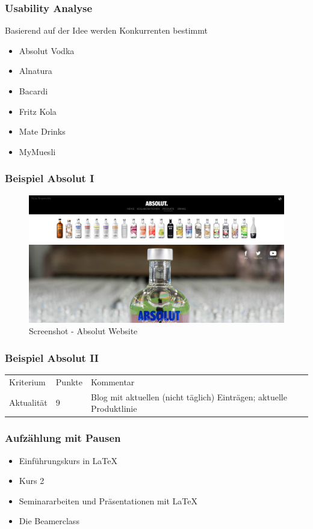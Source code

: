 \begin{frame}\frametitle{Usability Analyse}
Basierend auf der Idee werden Konkurrenten bestimmt
\begin{itemize}
\item Absolut Vodka
\item Alnatura
\item Bacardi
\item Fritz Kola
\item Mate Drinks
\item MyMuesli
\end{itemize}
\end{frame}

\begin{frame}\frametitle{Beispiel Absolut I}
\begin{figure}
\includegraphics[scale=0.2]{absolut}
\caption[Screenshot - Absolut Vodka]{Screenshot - Absolut Website}
\label{labelname}
\end{figure}
\end{frame}

\begin{frame}\frametitle{Beispiel Absolut II}
\begin{tabular}{lll}
  Kriterium & Punkte & Kommentar \\
  Aktualität & 9 & Blog mit aktuellen (nicht täglich) Einträgen; aktuelle Produktlinie \\
 \end{tabular}
\end{frame}









\begin{frame}\frametitle{Aufz\"ahlung mit Pausen}
\begin{itemize}
\item  Einf\"uhrungskurs in \LaTeX \pause 
\item  Kurs 2 \pause 
\item  Seminararbeiten und Pr\"asentationen mit \LaTeX \pause 
\item  Die Beamerclass
\end{itemize} 
\end{frame}

